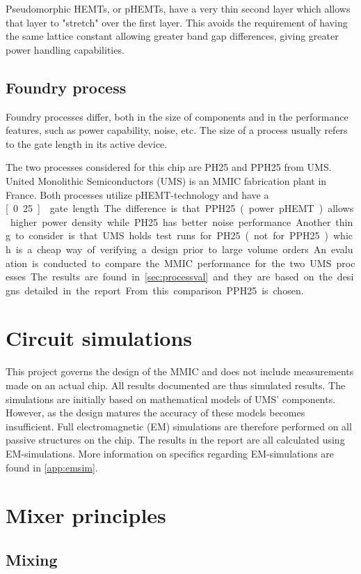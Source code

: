 			Pseudomorphic HEMTs, or pHEMTs, have a very thin second layer which allows that layer to "stretch" over the first layer. This avoids the requirement of having the same lattice constant allowing greater band gap differences, giving greater power handling capabilities.

		\subsection{Foundry process}
			Foundry processes differ, both in the size of components and in the performance features, such as power capability, noise, etc. The size of a process usually refers to the gate length in its active device.

			The two processes considered for this chip are PH25 and PPH25 from UMS. United Monolithic Semiconductors (UMS) is an MMIC fabrication plant in France. Both processes utilize pHEMT-technology and have a \unit[0.25]{\mum} gate length. The difference is that PPH25 (power pHEMT) allows higher power density while PH25 has better noise performance. Another thing to consider is that UMS holds test runs for PH25 (not for PPH25) which is a cheap way of verifying a design prior to large volume orders.
			
			An evaluation is conducted to compare the MMIC performance for the two UMS processes. The results are found in \autoref{sec:processval} and they are based on the designs detailed in the report. From this comparison PPH25 is chosen.

	\section{Circuit simulations}
		This project governs the design of the MMIC and does not include measurements made on an actual chip. All results documented are thus simulated results. The simulations are initially based on mathematical models of UMS' components. However, as the design matures the accuracy of these models becomes insufficient. Full electromagnetic (EM) simulations are therefore performed on all passive structures on the chip. The results in the report are all calculated using EM-simulations. More information on specifics regarding EM-simulations are found in \autoref{app:emsim}.

	\section{Mixer principles}\label{ch:introduction_mixer}
		\subsection{Mixing}
		
